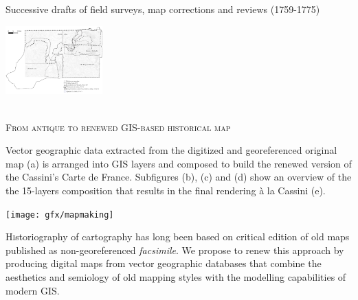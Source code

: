 \documentclass[portrait,a0]{sciposter}
\begin{document}
\begin{minipage}[b]{\textwidth}
\begin{multicols}{3}
    \begin{center}
      \captionsetup{type=figure}
      \caption{\scriptsize{Successive drafts of field surveys, map corrections and reviews (1759-1775)}}
      \label{map:contours}
      \includegraphics[width=0.28\textwidth]{gfx/Contours}
    \end{center}
~\\
    \normalsize
    \textsc{From antique to renewed GIS-based historical map}
    \vfill
    \begin{center}
      \captionsetup{type=figure}
      \caption{\scriptsize{Vector geographic data extracted from the digitized and georeferenced original map (a) is arranged into GIS layers and composed to build the renewed version of the Cassini's Carte de France. Subfigures (b), (c) and (d) show an overview of the the 15-layers composition that results in the final rendering à la Cassini (e).}}
      \texttt{[image: gfx/mapmaking]}
    \end{center}    
    \small \lettrine{H}istoriography of cartography has long been based on critical edition of old maps published as non-georeferenced \textit{facsimile}. We propose to renew this approach by producing digital maps from vector geographic databases that combine the aesthetics and semiology of old mapping styles with the modelling capabilities of modern GIS.
  \end{multicols}
\end{minipage}
\end{document}
